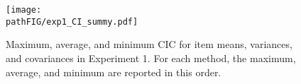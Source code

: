 \begin{figure}
\centering
\texttt{[image: \\pathFIG/exp1\_CI\_summy.pdf]}
\caption{\label{fig:exp1cir}
	Maximum, average, and minimum CIC for item means, variances, and covariances in Experiment 1.
	For each method, the maximum, average, and minimum are reported in this order.
	}
\end{figure}
	

